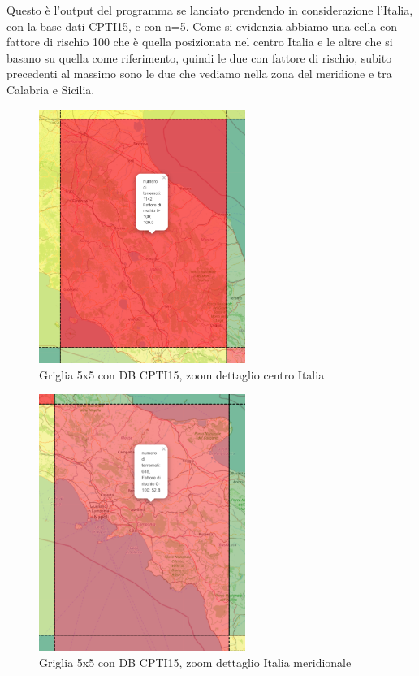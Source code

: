 Questo \`e l'output del programma se lanciato prendendo in considerazione l'Italia, con la base dati CPTI15, e con n=5. Come si evidenzia abbiamo una cella con fattore di rischio 100 che \`e quella posizionata nel centro Italia e le altre che si basano su quella come riferimento, quindi le due con fattore di rischio, subito precedenti al massimo sono le due che vediamo nella zona del meridione e tra Calabria e Sicilia.

\begin{figure}[H]
   \centering
   \includegraphics[width=0.600\textwidth]{images/FattoreDiRischio5x5_CPTI15_centro.png}
   \caption{Griglia 5x5 con DB CPTI15, zoom dettaglio centro Italia}
   \label{fig:zonaCentrale}
\end{figure}

\begin{figure}[H]
   \centering
   \includegraphics[width=0.600\textwidth]{images/FattoreDiRischio5x5_CPTI15_meridione.png}
   \caption{Griglia 5x5 con DB CPTI15, zoom dettaglio Italia meridionale}
   \label{fig:zonaMeridionale}
\end{figure}

